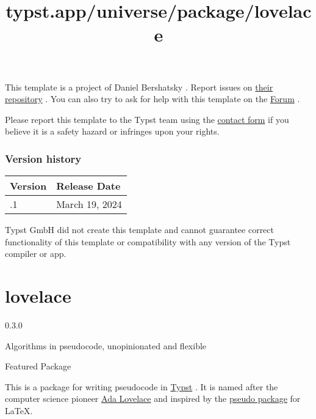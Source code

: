 This template is a project of Daniel Bershatsky . Report issues on
\href{https://github.com/daskol/typst-templates}{their repository} . You
can also try to ask for help with this template on the
\href{https://forum.typst.app}{Forum} .

Please report this template to the Typst team using the
\href{https://typst.app/contact}{contact form} if you believe it is a
safety hazard or infringes upon your rights.

\label{versions}
\subsubsection{Version history}\label{version-history}

\begin{longtable}[]{@{}ll@{}}
\toprule\noalign{}
Version & Release Date \\
\midrule\noalign{}
\endhead
\bottomrule\noalign{}
\endlastfoot
0.2.1 & March 19, 2024 \\
\end{longtable}

Typst GmbH did not create this template and cannot guarantee correct
functionality of this template or compatibility with any version of the
Typst compiler or app.


\title{typst.app/universe/package/lovelace}

\label{banner}
\section{lovelace}\label{lovelace}

{ 0.3.0 }

Algorithms in pseudocode, unopinionated and flexible

{ } Featured Package

\label{readme}
This is a package for writing pseudocode in
\href{https://typst.app/}{Typst} . It is named after the computer
science pioneer \href{https://en.wikipedia.org/wiki/Ada_Lovelace}{Ada
Lovelace} and inspired by the \href{https://ctan.org/pkg/pseudo}{pseudo
package} for LaTeX.


